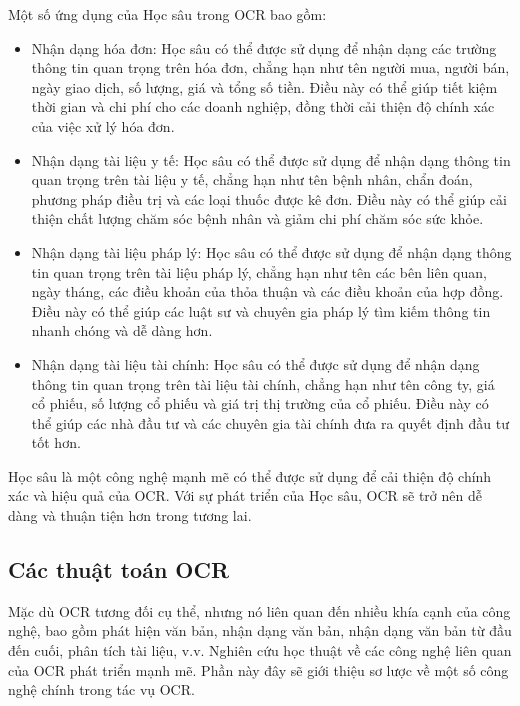 Một số ứng dụng của Học sâu trong OCR bao gồm:
\begin{itemize}
    \item Nhận dạng hóa đơn: Học sâu có thể được sử dụng để nhận dạng các trường thông tin quan trọng trên hóa đơn, chẳng hạn như tên người mua, người bán, ngày giao dịch, số lượng, giá và tổng số tiền. Điều này có thể giúp tiết kiệm thời gian và chi phí cho các doanh nghiệp, đồng thời cải thiện độ chính xác của việc xử lý hóa đơn.
    \item Nhận dạng tài liệu y tế: Học sâu có thể được sử dụng để nhận dạng thông tin quan trọng trên tài liệu y tế, chẳng hạn như tên bệnh nhân, chẩn đoán, phương pháp điều trị và các loại thuốc được kê đơn. Điều này có thể giúp cải thiện chất lượng chăm sóc bệnh nhân và giảm chi phí chăm sóc sức khỏe.
    \item Nhận dạng tài liệu pháp lý: Học sâu có thể được sử dụng để nhận dạng thông tin quan trọng trên tài liệu pháp lý, chẳng hạn như tên các bên liên quan, ngày tháng, các điều khoản của thỏa thuận và các điều khoản của hợp đồng. Điều này có thể giúp các luật sư và chuyên gia pháp lý tìm kiếm thông tin nhanh chóng và dễ dàng hơn.
    \item Nhận dạng tài liệu tài chính: Học sâu có thể được sử dụng để nhận dạng thông tin quan trọng trên tài liệu tài chính, chẳng hạn như tên công ty, giá cổ phiếu, số lượng cổ phiếu và giá trị thị trường của cổ phiếu. Điều này có thể giúp các nhà đầu tư và các chuyên gia tài chính đưa ra quyết định đầu tư tốt hơn.
\end{itemize}
Học sâu là một công nghệ mạnh mẽ có thể được sử dụng để cải thiện độ chính xác và hiệu quả của OCR. Với sự phát triển của Học sâu, OCR sẽ trở nên dễ dàng và thuận tiện hơn trong tương lai.

\subsection{Các thuật toán OCR}
Mặc dù OCR tương đối cụ thể, nhưng nó liên quan đến nhiều khía cạnh của công nghệ, bao gồm phát hiện văn bản, nhận dạng văn bản, nhận dạng văn bản từ đầu đến cuối, phân tích tài liệu, v.v. Nghiên cứu học thuật về các công nghệ liên quan của OCR phát triển mạnh mẽ. Phần này đây sẽ giới thiệu sơ lược về một số công nghệ chính trong tác vụ OCR.

